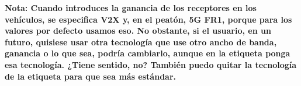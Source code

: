 \par\medskip
    \textbf{Nota: Cuando introduces la ganancia de los receptores en los vehículos, se especifica V2X y, en el peatón, 5G FR1, porque para los valores por defecto usamos eso. No obstante, si el usuario, en un futuro, quisiese usar otra tecnología que use otro ancho de banda, ganancia o lo que sea, podría cambiarlo, aunque en la etiqueta ponga esa tecnología. ¿Tiene sentido, no? También puedo quitar la tecnología de la etiqueta para que sea más estándar.}
\par\medskip
